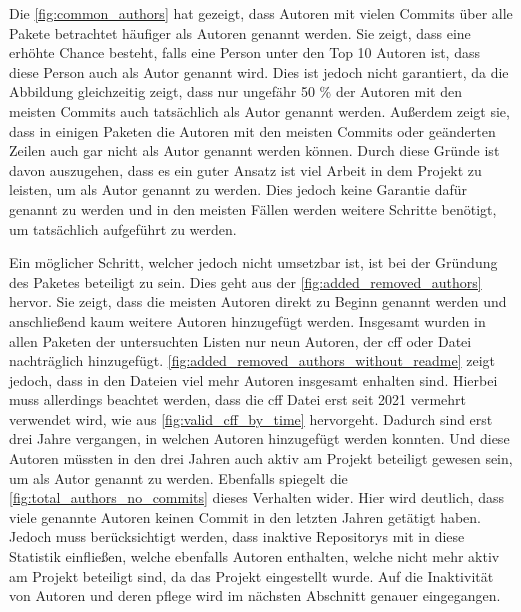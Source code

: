 Die \autoref{fig:common_authors} hat gezeigt, dass Autoren mit vielen Commits über alle Pakete betrachtet häufiger als Autoren genannt werden.
Sie zeigt, dass eine erhöhte Chance besteht, falls eine Person unter den Top 10 Autoren ist, dass diese Person auch als Autor genannt wird.
Dies ist jedoch nicht garantiert, da die Abbildung gleichzeitig zeigt, dass nur ungefähr 50 \% der Autoren mit den meisten Commits auch tatsächlich als Autor genannt werden.
Außerdem zeigt sie, dass in einigen Paketen die Autoren mit den meisten Commits oder geänderten Zeilen auch gar nicht als Autor genannt werden können.
Durch diese Gründe ist davon auszugehen, dass es ein guter Ansatz ist viel Arbeit in dem Projekt zu leisten, um als Autor genannt zu werden.
Dies jedoch keine Garantie dafür genannt zu werden und in den meisten Fällen werden weitere Schritte benötigt, um tatsächlich aufgeführt zu werden.

Ein möglicher Schritt, welcher jedoch nicht umsetzbar ist, ist bei der Gründung des Paketes beteiligt zu sein.
Dies geht aus der \autoref{fig:added_removed_authors} hervor.
Sie zeigt, dass die meisten Autoren direkt zu Beginn genannt werden und anschließend kaum weitere Autoren hinzugefügt werden.
Insgesamt wurden in allen Paketen der untersuchten Listen nur neun Autoren, der \gls{cff} oder  Datei nachträglich hinzugefügt.
\autoref{fig:added_removed_authors_without_readme} zeigt jedoch, dass in den Dateien viel mehr Autoren insgesamt enhalten sind.
Hierbei muss allerdings beachtet werden, dass die \gls{cff} Datei erst seit 2021 vermehrt verwendet wird, wie aus \autoref{fig:valid_cff_by_time} hervorgeht.
Dadurch sind erst drei Jahre vergangen, in welchen Autoren hinzugefügt werden konnten.
Und diese Autoren müssten in den drei Jahren auch aktiv am Projekt beteiligt gewesen sein, um als Autor genannt zu werden.
Ebenfalls spiegelt die \autoref{fig:total_authors_no_commits} dieses Verhalten wider.
Hier wird deutlich, dass viele genannte Autoren keinen Commit in den letzten Jahren getätigt haben.
Jedoch muss berücksichtigt werden, dass inaktive Repositorys mit in diese Statistik einfließen, welche ebenfalls Autoren enthalten, welche nicht mehr aktiv am Projekt beteiligt sind, da das Projekt eingestellt wurde.
Auf die Inaktivität von Autoren und deren pflege wird im nächsten Abschnitt genauer eingegangen.

